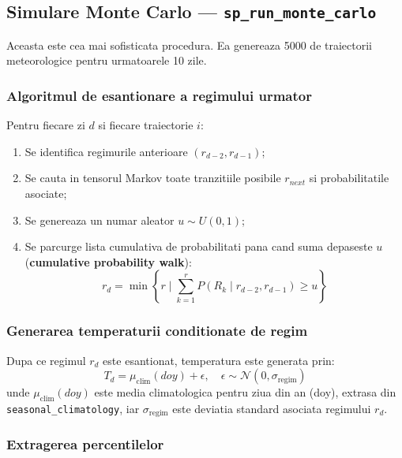 \documentclass[12pt,a4paper]{article}
\begin{document}
\subsection{Simulare Monte Carlo --- \texttt{sp\_run\_monte\_carlo}}

Aceasta este cea mai sofisticata procedura. Ea genereaza 5000 de traiectorii meteorologice pentru urmatoarele 10 zile.

\subsubsection{Algoritmul de esantionare a regimului urmator}

Pentru fiecare zi $d$ si fiecare traiectorie $i$:
\begin{enumerate}
    \item Se identifica regimurile anterioare $(r_{d-2}, r_{d-1})$;
    \item Se cauta in tensorul Markov toate tranzitiile posibile $r_{next}$ si probabilitatile asociate;
    \item Se genereaza un numar aleator $u \sim U(0,1)$;
    \item Se parcurge lista cumulativa de probabilitati pana cand suma depaseste $u$ (\textbf{cumulative probability walk}):
    \begin{equation}
    r_d = \min \left\{ r \mid \sum_{k=1}^{r} P(R_k \mid r_{d-2}, r_{d-1}) \geq u \right\}
    \end{equation}
\end{enumerate}

\subsubsection{Generarea temperaturii conditionate de regim}

Dupa ce regimul $r_d$ este esantionat, temperatura este generata prin:
\begin{equation}
T_d = \mu_{\text{clim}}(doy) + \epsilon, \quad \epsilon \sim \mathcal{N}(0, \sigma_{\text{regim}})
\end{equation}
unde $\mu_{\text{clim}}(doy)$ este media climatologica pentru ziua din an (doy), extrasa din \texttt{seasonal\_climatology}, iar $\sigma_{\text{regim}}$ este deviatia standard asociata regimului $r_d$.

\subsubsection{Extragerea percentilelor}
\end{document}
